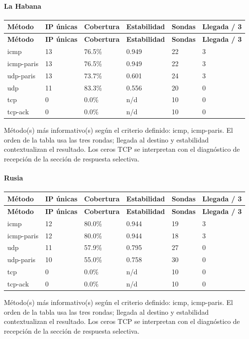 \paragraph{La Habana}
\begingroup
\fontsize{9}{11}\selectfont
\addtocounter{table}{-1}
\begin{longtable}{p{3.1cm}p{1.9cm}p{2.1cm}p{2.1cm}p{1.8cm}p{2.1cm}}
\toprule
\textbf{Método} & \textbf{IP únicas} & \textbf{Cobertura} & \textbf{Estabilidad} & \textbf{Sondas} & \textbf{Llegada / 3} \\ \midrule
\endfirsthead
\toprule
\textbf{Método} & \textbf{IP únicas} & \textbf{Cobertura} & \textbf{Estabilidad} & \textbf{Sondas} & \textbf{Llegada / 3} \\ \midrule
\endhead
icmp & 13 & 76.5\% & 0.949 & 22 & 3 \\
icmp-paris & 13 & 76.5\% & 0.949 & 22 & 3 \\
udp-paris & 13 & 73.7\% & 0.601 & 24 & 3 \\
udp & 11 & 83.3\% & 0.556 & 20 & 0 \\
tcp & 0 & 0.0\% & n/d & 10 & 0 \\
tcp-ack & 0 & 0.0\% & n/d & 10 & 0 \\
\bottomrule
\end{longtable}
\endgroup
Método(s) más informativo(s) según el criterio definido: icmp, icmp-paris. El orden de la tabla usa las tres rondas; llegada al destino y estabilidad contextualizan el resultado. Los ceros TCP se interpretan con el diagnóstico de recepción de la sección de respuesta selectiva.

\paragraph{Rusia}
\begingroup
\fontsize{9}{11}\selectfont
\addtocounter{table}{-1}
\begin{longtable}{p{3.1cm}p{1.9cm}p{2.1cm}p{2.1cm}p{1.8cm}p{2.1cm}}
\toprule
\textbf{Método} & \textbf{IP únicas} & \textbf{Cobertura} & \textbf{Estabilidad} & \textbf{Sondas} & \textbf{Llegada / 3} \\ \midrule
\endfirsthead
\toprule
\textbf{Método} & \textbf{IP únicas} & \textbf{Cobertura} & \textbf{Estabilidad} & \textbf{Sondas} & \textbf{Llegada / 3} \\ \midrule
\endhead
icmp & 12 & 80.0\% & 0.944 & 19 & 3 \\
icmp-paris & 12 & 80.0\% & 0.944 & 18 & 3 \\
udp & 11 & 57.9\% & 0.795 & 27 & 0 \\
udp-paris & 10 & 55.0\% & 0.758 & 30 & 0 \\
tcp & 0 & 0.0\% & n/d & 10 & 0 \\
tcp-ack & 0 & 0.0\% & n/d & 10 & 0 \\
\bottomrule
\end{longtable}
\endgroup
Método(s) más informativo(s) según el criterio definido: icmp, icmp-paris. El orden de la tabla usa las tres rondas; llegada al destino y estabilidad contextualizan el resultado. Los ceros TCP se interpretan con el diagnóstico de recepción de la sección de respuesta selectiva.

